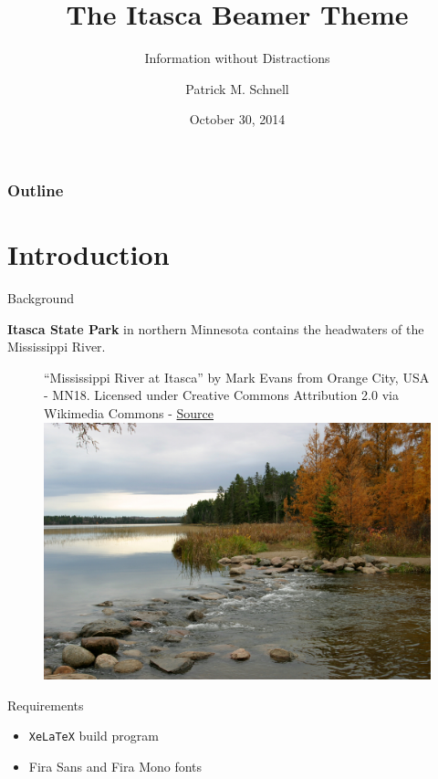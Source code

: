 \documentclass{beamer}
\title{The Itasca Beamer Theme}
\subtitle{Information without Distractions}
\date[2014-10-30]{October 30, 2014}
\author[P. M. Schnell]{Patrick M. Schnell}
\begin{document}
\begin{frame}
	\titlepage
\end{frame}

\begin{frame}
	\frametitle{Outline}
	\tableofcontents
\end{frame}

\section{Introduction}

\sectionpage

\begin{frame}{Background}

	\textbf{Itasca State Park} in northern Minnesota contains the headwaters of the Mississippi River.

	\begin{figure}\label{fig:itasca}
	\centering
	\captionbox
		{``Mississippi River at Itasca'' by Mark Evans from Orange City, USA - MN18. Licensed under Creative Commons Attribution 2.0 via Wikimedia Commons - \href{http://commons.wikimedia.org/wiki/File:Mississippi_River_at_Itasca.jpg}{Source}}
		{\includegraphics[trim=0cm 4cm 0cm 4cm, clip, width=\textwidth]{graphics/mississippi-river}}
	\end{figure}
\end{frame}

\begin{frame}{Requirements}
	\begin{itemize}
		\item \texttt{XeLaTeX} build program
		\item Fira Sans and Fira Mono fonts
	\end{itemize}
\end{frame}
\end{document}
